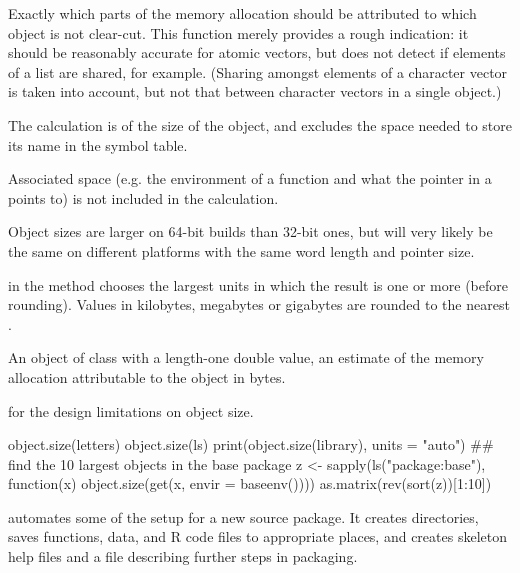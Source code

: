 \begin{Details}\relax
Exactly which parts of the memory allocation should be attributed to
which object is not clear-cut.  This function merely provides a rough
indication: it should be reasonably accurate for atomic vectors, but
does not detect if elements of a list are shared, for example.
(Sharing amongst elements of a character vector is taken into account,
but not that between character vectors in a single object.)

The calculation is of the size of the object, and excludes the space
needed to store its name in the symbol table.

Associated space (e.g. the environment of a function and what the
pointer in a  points to) is not included in the
calculation.

Object sizes are larger on 64-bit builds than 32-bit ones, but will
very likely be the same on different platforms with the same word
length and pointer size.

 in the  method chooses the largest
units in which the result is one or more (before rounding).  Values in
kilobytes, megabytes or gigabytes are rounded to the nearest .
\end{Details}
%
\begin{Value}
An object of class  with a length-one double value,
an estimate of the memory allocation attributable to the object in bytes.
\end{Value}
%
\begin{SeeAlso}\relax
{} for the design limitations on object size.
\end{SeeAlso}
%
\begin{Examples}
\begin{ExampleCode}
object.size(letters)
object.size(ls)
print(object.size(library), units = "auto")
## find the 10 largest objects in the base package
z <- sapply(ls("package:base"), function(x)
            object.size(get(x, envir = baseenv())))
as.matrix(rev(sort(z))[1:10])
\end{ExampleCode}
\end{Examples}
%
\begin{Description}\relax
{} automates some of the setup for a new source
package.  It creates directories, saves functions, data, and R code files to
appropriate places, and creates skeleton help files and a
 file describing further steps in packaging.
\end{Description}
